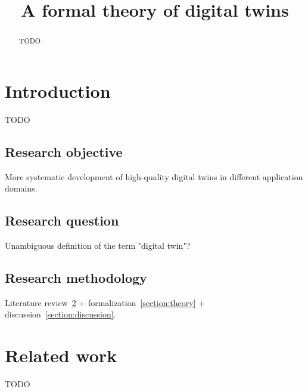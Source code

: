 \documentclass[conference]{IEEEtran}
\begin{document}
    \title{A formal theory of digital twins}

    \author{
        \and 
    }
   
    \maketitle

    \begin{abstract}
        TODO
    \end{abstract}

    \section{Introduction}
    \label{section:introduction}
    TODO~\cite{asf}

    \subsection{Research objective}
    More systematic development of high-quality digital twins in different application domains.

    \subsection{Research question}
    Unambiguous definition of the term "digital twin"?

    \subsection{Research methodology}
    Literature review~\ref{section:related} + formalization~\ref{section:theory} + discussion~\ref{section:discussion}.

    \section{Related work}
    \label{section:related}
    TODO
\end{document}
